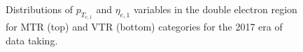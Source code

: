 \begin{figure}[htbp]
{    }
  \caption{Distributions of $p_{T_{e,1}}$ and $\eta_{e,1}$ variables in the double electron region for MTR (top) and VTR (bottom) categories for the 2017 era of data taking.}
  \label{app:2017_Zee_1}
\end{figure}

